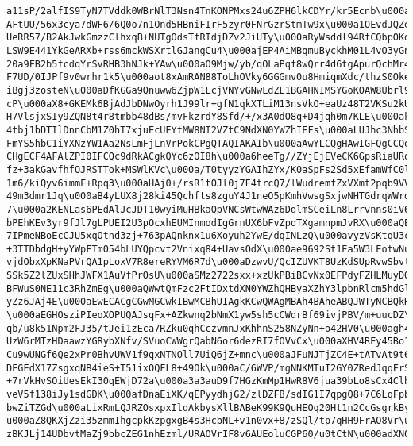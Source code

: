 \documentclass[12pt]{report}
\begin{document}
\begin{lstlisting}
a11sP/2alfIS9TyN7TVddk0WBrNlT3Nsn4TnKONPMxs24u6ZPH6lkCDYr/kr5Ecnb\u000a264/1XYu
AFtUU/56x3cya7dWF6/6Q0o7n1Ond5HBniFIrF5zyr0FNrGzrStmTw9x\u000a1OEvdJQZeN5DjVLPw
UeRR57/B2AkJwkGmzzClhxqB+NUTgOdsTfRIdjDZv2JiUTy\u000aRyWsddl94RfCQbpOKdtQfCSBg0
LSW9E441YkGeARXb+rss6mckWSXrtlGJangCu4\u000ajEP4AiMBqmuByckhM01L4vO3yGnzCdgfWEc
20a9FB2b5fcdqYrSvRHB3hNJk+YAw\u000aO9Mjw/yb/qOLaPqf8wQrr4d6tgApurQchMr4j4uswy1+
F7UD/0IJPf9v0wrhr1k5\u000aot8xAmRAN88ToLhOVky6GGGmv0u8HmiqmXdc/thzS0OkeLB5m/dE4
iBgj3zosteN\u000aDfKGGa9Qnuww6ZjpW1LcjVNYvGNwLdZL1BGAHNIMSYGoKOAW8Ubrl9ypbDFkbQ
cP\u000aX8+GKEMk6BjAdJbDNwOyrh1J99lr+gfN1qkXTLiM13nsVkO+eaUz48T2VKSu2kUZ\u000a
H7VlsjxSIy9ZQN8t4r8tmbb48dBs/mvFkzrdY8Sfd/+/x3A0dO8q+D4jqh0m7KLE\u000akse+rpP2Q
4tbj1bDTIlDnnCbM1Z0hT7xjuEcUEYtMW8NI2VZtC9NdXN0YWZhIEFs\u000aLUJhc3NhbSA8bXVzdG
FmYS5hbC1iYXNzYW1Aa2NsLmFjLnVrPokCPgQTAQIAKAIb\u000aAwYLCQgHAwIGFQgCCQoLBBYCAwE
CHgECF4AFAlZPI0IFCQc9dRkACgkQYc6zOI8h\u000a6heeTg//ZYjEjEVeCK6GpsRiaURoW0cTlngO
fz+3akGavfhfOJRSTTok+MSWlKVc\u000a/T0tyyzYGAIhZYx/K0aSpFs2Sd5xEfamWfC0loMyLHq5n
1m6/kiQyv6immF+Rpq3\u000aHAj0+/rsR1tOJl0j7E4trcQ7/lWudremfZxVXmt2pqb9VVNr403yFD
49m3dmr1Jq\u000aB4yLUX8j28ki45Qchfts8zguY4J1neO5pKmhVwsgSxjwNHTGdrqWWrdz1+iXtRt
7\u000a2KENLas6PEdAlJcJDT10wyiMuHBkaQpVNCsWtwWAz6DdlmSCeiLn8Lrrvnns0iV6\u000a/
bPEhKEv3yr9fJl7gLPUEI2U3pOcxhEUMInmodIgGrnUX6bFvZpdTXgamnpmJvRX\u000aQEdYkFcgkR
7IPmeNBoEcCJU5xqOtnd3zj+763pAQnknx1u6Xoyuh2YwE/dqINLzQ\u000avyzVsKtqU3ckUw1tCtq
+3TTDbdgH+yYWpFTm054bLUYQpcvt2Vnixq84+UavsOdX\u000ae9692St1Ea5W3LEotwNui6zZbXU5
vjdObxXpKNaPVrQA1pLoxV7R8ereRYVM6R7d\u000aDzwvU/QcIZUVKT8UzKdSUpRvwSbvtRVMOkIj/
SSk5Z2lZUxSHhJWFX1AuVfPrOsU\u000aSMz2722sxx+xzUkPBiBCvNx0EFPdyFZHLMuyDOIhUgjEhY
BFWuS0NE11c3RhZmEg\u000aQWwtQmFzc2FtIDxtdXN0YWZhQHByaXZhY3lpbnRlcm5hdGlvbmFsLm9
yZz6JAj4E\u000aEwECACgCGwMGCwkIBwMCBhUIAgkKCwQWAgMBAh4BAheABQJWTyNCBQkHPXUZAAoJ
\u000aEGHOsziPIeoXOPUQAJsqFx+AZkwnq2bNmX1yw5sh5cCWdrBf69ivjPBV/m+uucDZ\u000awK
qb/u8k51Npm2FJ35/tJei1zEca7RZku0qhCczvmnJxKhhnS258NZyNn+o42HV0\u000agh4u/4djxoQ
UzW6rMTzHDaawzYGRybXNfv/SVuoCWWgrQabN6or6dezRI7fOVvCx\u000aXHV4REy45Bo11v5KaYIL
Cu9wUNGf6Qe2xPr0BhvUWV1f9qxNTNOll7UiQ6jZ+mnc\u000aJFuNJTjZC4E+tATvAt9t67fy6Ss/d
DEGEdX17ZsgxqNB4ieS+T51ixOQFL8+49Ok\u000aC/6WVP/mgNNKMTuI2GY0ZRedJqqFrSWd/8RdLT
+7rVkHvSOiUesEkI30qEWjD72a\u000a3a3auD9f7HGzKmMp1HwR8V6jua39bLo8sCx4ClhKd1NMu2n
veV5f138iJy1sdGDK\u000afDnaEiXK/qEPyydhjG2/zlDZFB/sdIG1I7qpgQ8+7C6LqFpbsKLSCBH9
bwZiTZGd\u000aLixRmLQJRZOsxpxIldAkbysXllBABeK99K9QuHEOq20Ht1n2CcGsgrkBykBBHg4Y\
u000aZ8QKXjZzi35zmmIhgcpkKzpgxgB4s3HcbNL+v1n0vx+8/zSQl/tp7qHH9FrAO8Vr\u000aE0h
zBKJLj14UDbvtMaZj9bbcZEG1nhEzml/URAOVrIF8v6AUEoluCGP60/u0tCtN\u000adXN0YWZhIEFs

\end{lstlisting}
\end{document}
